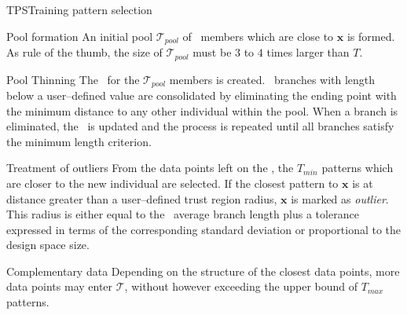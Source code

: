 \documentclass{vki_ls}
\newcommand{\vect}[1]{\bm{#1}}
\newcommand{\set}[1]{\mathcal{#1}}
\begin{document}
\begin{namedalgorithm}{TPS}{Training pattern selection}{}
\item[Pool formation]\label{a:tps-poolform}
    An initial pool $\set{T}_{pool}$ of \DB\ members which are close to $\vect{x}$ is formed. As rule of the thumb, the size of $\set{T}_{pool}$ must be $3$ to $4$ times larger than $T$.
%
\item[Pool Thinning]\label{a:tps-poolthin}
    The \MST\ for the $\set{T}_{pool}$ members is created. \MST\ branches with length below a user--defined value are consolidated by eliminating the ending point with the minimum distance to any other individual within the pool.
When a branch is eliminated, the \MST\ is updated and the process is repeated until all branches satisfy the minimum length criterion.
%
\item[Treatment of outliers]\label{a:tps-poolout}
    From the data points left on the \MST, the $T_{min}$ patterns which are closer to the new individual are selected. If the closest pattern to $\vect{x}$ is at distance greater than a user--defined trust region radius, $\vect{x}$ is marked as \emph{outlier}. 
This radius is either equal to the \MST\ average branch length plus a tolerance expressed in terms of the corresponding standard deviation or proportional to the design space size.
%
\item[Complementary data]\label{a:tps-finalts}
    Depending on the structure of the closest data points, more data points may enter $\set{T}$, without however exceeding the upper bound of $T_{max}$ patterns.
\end{namedalgorithm}
%
%
\end{document}

